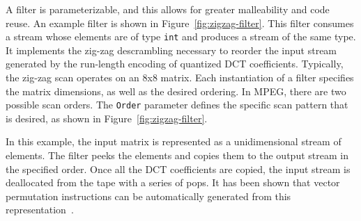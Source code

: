 A filter is parameterizable,
and this allows for greater malleability and code reuse. An example
filter is shown in Figure~\ref{fig:zigzag-filter}. This filter
consumes a stream whose elements are of type {\tt int} and produces a
stream of the same type. It implements the zig-zag descrambling
necessary to reorder the input stream generated by the run-length
encoding of quantized DCT coefficients. Typically, the zig-zag scan
operates on an 8x8 matrix. Each instantiation of a filter specifies the
matrix dimensions, as well as the desired ordering. In MPEG, there are
two possible scan orders. The {\tt Order} parameter defines the
specific scan pattern that is desired, as shown in 
Figure~\ref{fig:zigzag-filter}.

In this example, the input matrix is represented as a unidimensional
stream of elements. The filter peeks the elements and
copies them to the output stream in the specified order. Once all the
DCT coefficients are copied, the input stream is deallocated from the
tape with a series of pops.  It has been shown that vector permutation
instructions can be automatically generated from this
representation~\cite{yelick04msp}.

\begin{figure}[t]
\end{figure}


